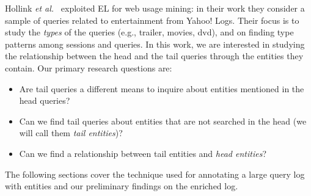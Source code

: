 

Hollink \emph{et al.}~\cite{hollink2013web} exploited EL for web usage mining: 
in their work they consider a sample of queries related to entertainment from 
Yahoo! Logs. Their focus is to study the \emph{types} of the queries (e.g., trailer, movies, dvd), and on finding
type patterns among sessions and queries. In this work, we are interested in studying the 
relationship between the head and the tail queries through the entities they contain. 
Our primary research questions are:
\begin{itemize}
	\item Are tail queries a different means to inquire about entities mentioned in the head queries? 
	\item Can we find tail queries about entities that are not searched in the head (we will call them \emph{tail entities})?
	\item Can we find a relationship between tail entities and \emph{head entities}?  
\end{itemize} 

The following sections cover the technique used for annotating a large query log with entities and our 
preliminary findings on the enriched log.


 
